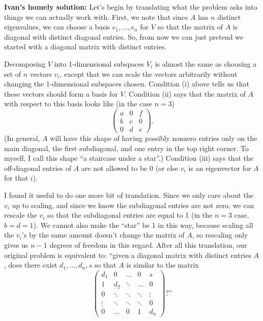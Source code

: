\begin{solution}
\textbf{Ivan's homely solution:} Let's begin by translating what the problem asks into things we can actually work with. First, we note that since $A$ has $n$ distinct eigenvalues, we can choose a basis $e_1,\dots,e_n$ for $V$ so that the matrix of $A$ is diagonal with distinct diagonal entries. So, from now we can just pretend we started with a diagonal matrix with distinct entries.

Decomposing $V$ into 1-dimensional subspaces $V_i$ is almost the same as choosing a set of $n$ vectors $v_i$, except that we can scale the vectors arbitrarily without changing the 1-dimensional subspaces chosen. Condition (i) above tells us that these vectors should form a basis for $V$. Condition (ii) says that the matrix of $A$ with respect to this basis looks like (in the case $n = 3$)
\[\begin{pmatrix}a & 0 & f\\ b & c & 0\\ 0 & d & e \end{pmatrix}.\]
(In general, $A$ will have this shape of having possibly nonzero entries only on the main diagonal, the first subdiagonal, and one entry in the top right corner. To myself, I call this shape ``a staircase under a star''.) Condition (iii) says that the off-diagonal entries of $A$ are not allowed to be 0 (or else $v_i$ is an eigenvector for $A$ for that $i$).

I found it useful to do one more bit of translation. Since we only care about the $v_i$ up to scaling, and since we know the subdiagonal entries are not zero, we can rescale the $v_i$ so that the subdiagonal entries are equal to 1 (in the $n = 3$ case, $b = d = 1$). We cannot also make the ``star'' be 1 in this way, because scaling all the $v_i$'s by the same amount doesn't change the matrix of $A$, so rescaling only gives us $n-1$ degrees of freedom in this regard. After all this translation, our original problem is equivalent to: ``given a diagonal matrix with distinct entries $A$, does there exist $d_1,\dots,d_n,s$ so that $A$ is similar to the matrix
\[\begin{pmatrix} d_1 & 0 & \dots & 0 & s \\ 1 & d_2 & \ddots & \dots & 0 \\ 0 & \ddots & \ddots & \ddots & \vdots\\ \vdots & \ddots & \ddots & \ddots & 0 \\ 0 & \dots & 0 & 1 & d_n \end{pmatrix}\text{?''}\]


\end{solution}
